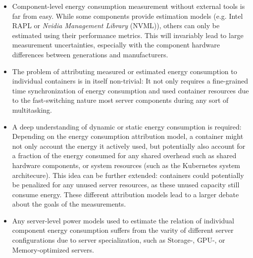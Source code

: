 \begin{itemize}
    \item Component-level energy consumption measurement without external tools is far from easy. While some components provide estimation models (e.g. Intel RAPL or \textit{Nvidia Management Library} (NVML)), others can only be estimated using their performance metrics. This will invariably lead to large measurement uncertainties, especially with the component hardware differences between generations and manufacturers.
    \item The problem of attributing measured or estimated energy consumption to individual containers is in itself non-trivial: It not only requires a fine-grained time synchronization of energy consumption and used container resources due to the fast-switching nature most server components during any sort of multitasking.
    \item A deep understanding of dynamic or static energy consumption is required: Depending on the energy consumption attribution model, a container might not only account the energy it actively used, but potentially also account for a fraction of the energy consumed for any shared overhead such as shared hardware components, or system resources (such as the Kubernetes system architecure). This idea can be further extended: containers could potentially be penalized for any unused server resources, as these unused capacity still consume energy. These different attribution models lead to a larger debate about the goals of the measurements.
    \item Any server-level power models used to estimate the relation of individual component energy consumption suffers from the varity of different server configurations due to server specialization, such as Storage-, GPU-, or Memory-optimized servers.
\end{itemize}

